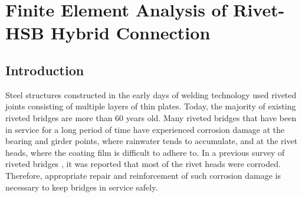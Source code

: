 \chapter{Finite Element Analysis of Rivet-HSB Hybrid Connection}
\label{ch3}

\begin{spacing}{1.25} %
\minitoc %
\end{spacing} %
\onehalfspacing %



\section{Introduction}

Steel structures constructed in the early days of welding technology used riveted joints consisting of multiple layers of thin plates. Today, the majority of existing riveted bridges are more than 60 years old. Many riveted bridges that have been in service for a long period of time have experienced corrosion damage at the bearing and girder points, where rainwater tends to accumulate, and at the rivet heads, where the coating film is difficult to adhere to. In a previous survey of riveted bridges \cite{okamoto2011investigation}, it was reported that most of the rivet heads were corroded. Therefore, appropriate repair and reinforcement of such corrosion damage is necessary to keep bridges in service safely.

